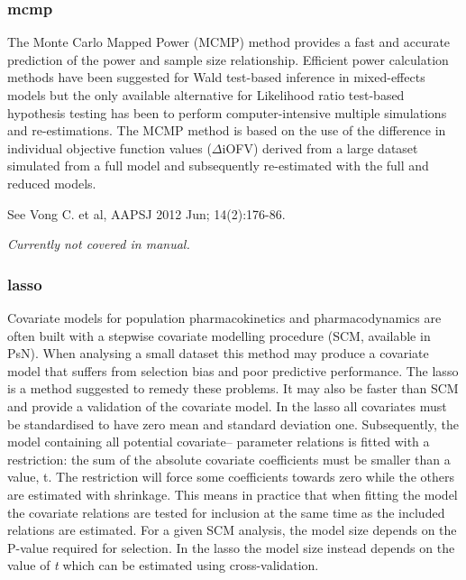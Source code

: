 \documentclass[a4,11pt]{report} \usepackage[pdftex]{graphicx}
\begin{document}
\subsubsection{mcmp}
The Monte Carlo Mapped Power (MCMP) method provides a fast and
accurate prediction of the power and sample size
relationship. Efficient power calculation methods have been suggested
for Wald test-based inference in mixed-effects models but the only
available alternative for Likelihood ratio test-based hypothesis
testing has been to perform computer-intensive multiple simulations
and re-estimations. The MCMP method is based on the use of the
difference in individual objective function values ($\Delta$iOFV)
derived from a large dataset simulated from a full model and
subsequently re-estimated with the full and reduced models.

\vspace{10pt}

\noindent See Vong C. et al, AAPSJ 2012 Jun; 14(2):176-86.

\vspace{10pt}

\noindent \textit{Currently not covered in manual.}

\subsubsection{lasso}
Covariate models for population pharmacokinetics and pharmacodynamics
are often built with a stepwise covariate modelling procedure (SCM,
available in PsN). When analysing a small dataset this method may
produce a covariate model that suffers from selection bias and poor
predictive performance. The lasso is a method suggested to remedy
these problems. It may also be faster than SCM and provide a
validation of the covariate model. In the lasso all covariates must be
standardised to have zero mean and standard deviation
one. Subsequently, the model containing all potential covariate–
parameter relations is fitted with a restriction: the sum of the
absolute covariate coefficients must be smaller than a value, t. The
restriction will force some coefficients towards zero while the others
are estimated with shrinkage. This means in practice that when fitting
the model the covariate relations are tested for inclusion at the same
time as the included relations are estimated. For a given SCM
analysis, the model size depends on the P-value required for
selection. In the lasso the model size instead depends on the value of
\textit{t} which can be estimated using cross-validation.
\end{document}
